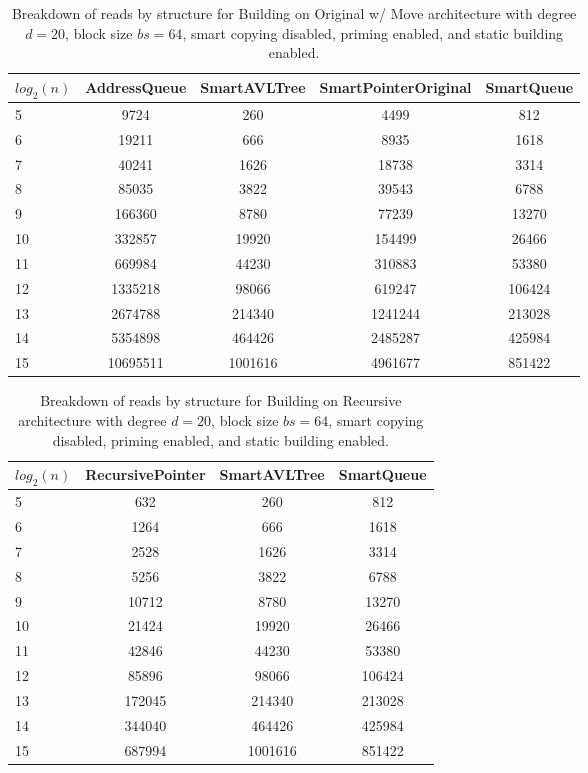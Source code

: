 \begin{table}[]
\centering
\begin{tabular}{|l|c|c|c|c|}
$log_2(n)$ & AddressQueue & SmartAVLTree & SmartPointerOriginal & SmartQueue \\ \hline
5 & 9724 & 260 & 4499 & 812 \\ \hline
6 & 19211 & 666 & 8935 & 1618 \\ \hline
7 & 40241 & 1626 & 18738 & 3314 \\ \hline
8 & 85035 & 3822 & 39543 & 6788 \\ \hline
9 & 166360 & 8780 & 77239 & 13270 \\ \hline
10 & 332857 & 19920 & 154499 & 26466 \\ \hline
11 & 669984 & 44230 & 310883 & 53380 \\ \hline
12 & 1335218 & 98066 & 619247 & 106424 \\ \hline
13 & 2674788 & 214340 & 1241244 & 213028 \\ \hline
14 & 5354898 & 464426 & 2485287 & 425984 \\ \hline
15 & 10695511 & 1001616 & 4961677 & 851422 \\ \hline
\end{tabular}
\caption{Breakdown of reads by structure for Building on Original w/ Move architecture with degree $d=20$, block size $bs=64$, smart copying disabled, priming enabled, and static building enabled.}
    \label{tab:reads_by_structure_build_d20_bs64_copiesfalse_primetrue_staticinsertiontrue_ptoriginal_movetrue}
\end{table}

\begin{table}[]
\centering
\begin{tabular}{|l|c|c|c|}
$log_2(n)$ & RecursivePointer & SmartAVLTree & SmartQueue \\ \hline
5 & 632 & 260 & 812 \\ \hline
6 & 1264 & 666 & 1618 \\ \hline
7 & 2528 & 1626 & 3314 \\ \hline
8 & 5256 & 3822 & 6788 \\ \hline
9 & 10712 & 8780 & 13270 \\ \hline
10 & 21424 & 19920 & 26466 \\ \hline
11 & 42846 & 44230 & 53380 \\ \hline
12 & 85896 & 98066 & 106424 \\ \hline
13 & 172045 & 214340 & 213028 \\ \hline
14 & 344040 & 464426 & 425984 \\ \hline
15 & 687994 & 1001616 & 851422 \\ \hline
\end{tabular}
\caption{Breakdown of reads by structure for Building on Recursive architecture with degree $d=20$, block size $bs=64$, smart copying disabled, priming enabled, and static building enabled.}
    \label{tab:reads_by_structure_build_d20_bs64_copiesfalse_primetrue_staticinsertiontrue_ptrecursive_movetrue}
\end{table}


